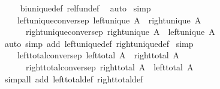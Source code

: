 \begin{isabellebody}
%
\isadelimproof
\ \ %
\endisadelimproof
%
\isatagproof
{}\isamarkupfalse%
\ bi{\isacharunderscore}{\kern0pt}unique{\isacharunderscore}{\kern0pt}def\ rel{\isacharunderscore}{\kern0pt}fun{\isacharunderscore}{\kern0pt}def\ \isamarkupfalse%
\ auto%
\endisatagproof
{\isafoldproof}%
%
\isadelimproof
\isanewline
%
\endisadelimproof
\isanewline
{}\isamarkupfalse%
\ {\isacharbrackleft}{\kern0pt}simp{\isacharbrackright}{\kern0pt}{\isacharcolon}{\kern0pt}\isanewline
\ \ \ left{\isacharunderscore}{\kern0pt}unique{\isacharunderscore}{\kern0pt}conversep{\isacharcolon}{\kern0pt}\ {\isachardoublequoteopen}left{\isacharunderscore}{\kern0pt}unique\ A{\isasyminverse}{\isasyminverse}\ {\isasymlongleftrightarrow}\ right{\isacharunderscore}{\kern0pt}unique\ A{\isachardoublequoteclose}\isanewline
\ \ \ \ \ right{\isacharunderscore}{\kern0pt}unique{\isacharunderscore}{\kern0pt}conversep{\isacharcolon}{\kern0pt}\ {\isachardoublequoteopen}right{\isacharunderscore}{\kern0pt}unique\ A{\isasyminverse}{\isasyminverse}\ {\isasymlongleftrightarrow}\ left{\isacharunderscore}{\kern0pt}unique\ A{\isachardoublequoteclose}\isanewline
%
\isadelimproof
\ \ %
\endisadelimproof
%
\isatagproof
{}\isamarkupfalse%
{\isacharparenleft}{\kern0pt}auto\ simp\ add{\isacharcolon}{\kern0pt}\ left{\isacharunderscore}{\kern0pt}unique{\isacharunderscore}{\kern0pt}def\ right{\isacharunderscore}{\kern0pt}unique{\isacharunderscore}{\kern0pt}def{\isacharparenright}{\kern0pt}%
\endisatagproof
{\isafoldproof}%
%
\isadelimproof
\isanewline
%
\endisadelimproof
\isanewline
{}\isamarkupfalse%
\ {\isacharbrackleft}{\kern0pt}simp{\isacharbrackright}{\kern0pt}{\isacharcolon}{\kern0pt}\isanewline
\ \ \ left{\isacharunderscore}{\kern0pt}total{\isacharunderscore}{\kern0pt}conversep{\isacharcolon}{\kern0pt}\ {\isachardoublequoteopen}left{\isacharunderscore}{\kern0pt}total\ A{\isasyminverse}{\isasyminverse}\ {\isasymlongleftrightarrow}\ right{\isacharunderscore}{\kern0pt}total\ A{\isachardoublequoteclose}\isanewline
\ \ \ \ \ right{\isacharunderscore}{\kern0pt}total{\isacharunderscore}{\kern0pt}conversep{\isacharcolon}{\kern0pt}\ {\isachardoublequoteopen}right{\isacharunderscore}{\kern0pt}total\ A{\isasyminverse}{\isasyminverse}\ {\isasymlongleftrightarrow}\ left{\isacharunderscore}{\kern0pt}total\ A{\isachardoublequoteclose}\isanewline
%
\isadelimproof
\ \ %
\endisadelimproof
%
\isatagproof
{}\isamarkupfalse%
{\isacharparenleft}{\kern0pt}simp{\isacharunderscore}{\kern0pt}all\ add{\isacharcolon}{\kern0pt}\ left{\isacharunderscore}{\kern0pt}total{\isacharunderscore}{\kern0pt}def\ right{\isacharunderscore}{\kern0pt}total{\isacharunderscore}{\kern0pt}def{\isacharparenright}{\kern0pt}%

\end{isabellebody}
